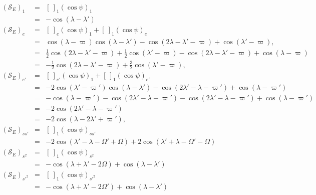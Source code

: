\documentclass [12pt, a4paper] {article}
\begin{document}
\begin {eqnarray}
    (\mathcal{S}_E)_1 
    &=& 
    \left[\:\right]_1
    \left(\cos\psi\right)_1
    \\
    &=& -\cos(\lambda - \lambda')
    \\
    (\mathcal{S}_E)_e
    &=& 
    \left[\:\right]_e
    \left(\cos\psi\right)_1
    +
    \left[\:\right]_1
    \left(\cos\psi\right)_e
    \\
    &=&
    \cos(\lambda - \varpi)\cos(\lambda - \lambda')
    - 
    \cos(2\lambda - \lambda' - \varpi) 
    +
    \cos(\lambda' - \varpi),
    \\
    &=&
    \frac{1}{2}\cos(2\lambda - \lambda' - \varpi)
    +
    \frac{1}{2}\cos(\lambda' - \varpi)
    -
    \cos(2\lambda - \lambda' - \varpi)
    +
    \cos(\lambda - \varpi)
    \\
    &=&
    -\frac{1}{2}\cos(2\lambda - \lambda' - \varpi)
    +
    \frac{3}{2}\cos(\lambda' - \varpi),
    \\
    (\mathcal{S}_E)_{e'}
    &=& 
    \left[\:\right]_{e'}
    \left(\cos\psi\right)_1
    +
    \left[\:\right]_1
    \left(\cos\psi\right)_{e'}
    \\
    &=&
    -2\cos(\lambda' - \varpi')\cos(\lambda - \lambda')
    - 
    \cos(2\lambda' - \lambda - \varpi')
    +
    \cos(\lambda - \varpi')
    \\
    &=&
    -\cos(\lambda - \varpi')
    -
    \cos(2\lambda' - \lambda - \varpi')
    - 
    \cos(2\lambda' - \lambda - \varpi')
    +
    \cos(\lambda - \varpi')
    \\
    &=&
    - 
    2\cos(2\lambda' - \lambda - \varpi')
    \\
    &=&
    -2\cos(\lambda - 2\lambda' + \varpi'),
    \\
    (\mathcal{S}_E)_{ss'}
    &=& 
    \left[\:\right]_{1}
    \left(\cos\psi\right)_{ss'}
    \\
    &=&
    -2\cos(\lambda' - \lambda - \Omega' + \Omega)
    + 2\cos(\lambda' + \lambda - \Omega' - \Omega)
    \\
    (\mathcal{S}_E)_{s^2}
    &=& 
    \left[\:\right]_{1}
    \left(\cos\psi\right)_{s^2}
    \\
    &=&
    -\cos(\lambda + \lambda' - 2\Omega)
    + \cos(\lambda - \lambda')
    \\
    (\mathcal{S}_E)_{s'^2}
    &=& 
    \left[\:\right]_{1}
    \left(\cos\psi\right)_{s'^2}
    \\
    &=&
    -\cos(\lambda + \lambda' - 2\Omega')
    + \cos(\lambda - \lambda')
\end {eqnarray}
\end{document}
